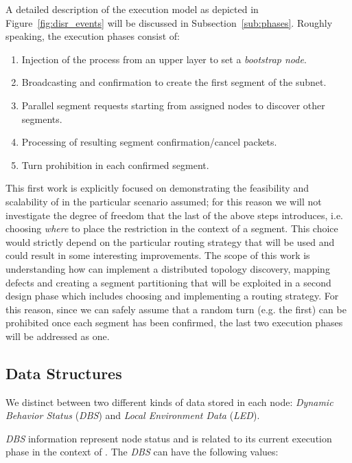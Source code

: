 A detailed description of the \disr{} execution model as depicted in
Figure~\ref{fig:disr_events} will be discussed in
Subsection~\ref{sub:phases}. Roughly speaking, the execution phases consist of:
\begin{enumerate}
\item Injection of the \disr{} process from an upper layer to set a \emph{bootstrap
node}.
\item Broadcasting and confirmation to create the first segment of the subnet.
\item Parallel segment requests starting from assigned nodes to discover other
segments. 
\item Processing of resulting segment confirmation/cancel packets.
\item Turn prohibition in each confirmed segment.
\end{enumerate}

This first work is explicitly focused on demonstrating
the feasibility and scalability of \disr{} in the particular scenario
assumed; for this reason we will not investigate the degree of
freedom that the last of the above steps introduces, i.e. choosing
\emph{where} to place the restriction in the context of a
segment. This choice would strictly depend on the particular routing
strategy that will be used and could result in some interesting
improvements. The scope of this work is understanding how \disr{} can
implement a distributed topology discovery, mapping defects and
creating a segment partitioning that will be exploited in a second
design phase which includes choosing and implementing a routing strategy. 
For this reason, since we can safely assume that a random turn (e.g. 
the first) can be prohibited once each segment has been confirmed, the 
last two execution phases will be addressed as one.

\subsection{\disr{} Data Structures}
\label{ssec:disr_data}

We distinct between two different kinds of data stored in each node:
\emph{Dynamic Behavior Status} (\emph{DBS}) and \emph{Local
Environment Data} (\emph{LED}).

\emph{DBS} information represent node status and is related to its
current execution phase in the context of \disr{}.
The \emph{DBS} can have the following values:


